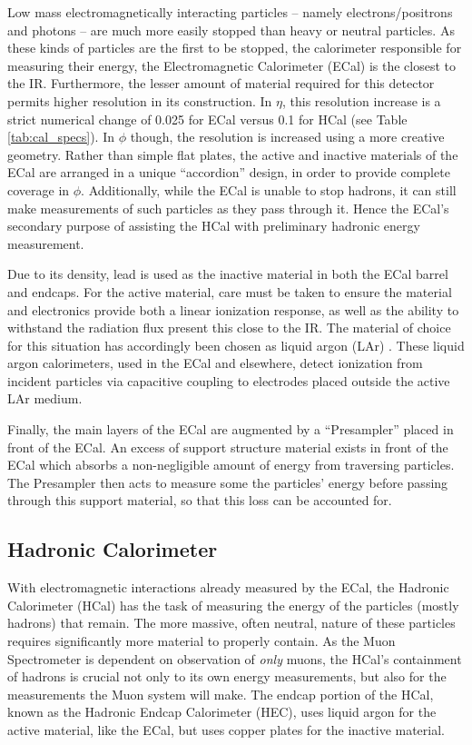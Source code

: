         Low mass electromagnetically interacting particles -- namely electrons/positrons and photons --
            are much more easily stopped than heavy or neutral particles.
        As these kinds of particles are the first to be stopped, the calorimeter responsible for measuring their energy, the Electromagnetic Calorimeter (ECal) is the closest to the IR.
        Furthermore, the lesser amount of material required for this detector permits higher resolution in its construction.
        In $\eta$, this resolution increase is a strict numerical change of 0.025 for ECal versus 0.1 for HCal (see Table \ref{tab:cal_specs}).
        In $\phi$ though, the resolution is increased using a more creative geometry.
        Rather than simple flat plates, the active and inactive materials of the ECal are arranged in a unique ``accordion'' design, in order to provide complete coverage in $\phi$.
        Additionally, while the ECal is unable to stop hadrons, it can still make measurements of such particles as they pass through it.
        Hence the ECal's secondary purpose of assisting the HCal with preliminary hadronic energy measurement.

        Due to its density, lead is used as the inactive material in both the ECal barrel and endcaps.
        For the active material, care must be taken to ensure the material and electronics provide both a linear ionization response, as well as the ability to withstand the radiation flux present this close to the IR.
        The material of choice for this situation has accordingly been chosen as liquid argon (LAr) \cite{Lar_cal_tdr}.
        These liquid argon calorimeters, used in the ECal and elsewhere, detect ionization from incident particles via capacitive coupling to electrodes placed outside the active LAr medium.

        Finally, the main layers of the ECal are augmented by a ``Presampler'' placed in front of the ECal.
        An excess of support structure material exists in front of the ECal which absorbs a non-negligible amount of energy from traversing particles.
        The Presampler then acts to measure some the particles' energy before passing through this support material, so that this loss can be accounted for.

    \subsection{Hadronic Calorimeter}

        With electromagnetic interactions already measured by the ECal,
            the Hadronic Calorimeter (HCal) has the task of measuring the energy of the particles (mostly hadrons) that remain.
        The more massive, often neutral, nature of these particles requires significantly more material to properly contain.
        As the Muon Spectrometer is dependent on observation of \textit{only} muons, the HCal's containment of hadrons is crucial not only to its own energy measurements, but also for the measurements the Muon system will make.
        The endcap portion of the HCal, known as the Hadronic Endcap Calorimeter (HEC), uses liquid argon for the active material, like the ECal, but uses copper plates for the inactive material.

